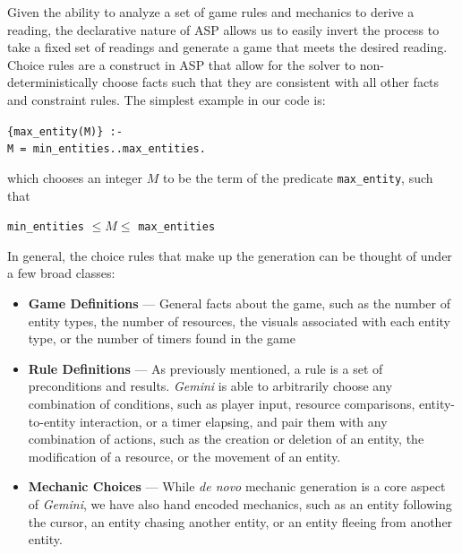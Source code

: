 \documentclass[12pt]{report}
\begin{document}
Given the ability to analyze a set of game rules and mechanics to derive a reading, the declarative nature of ASP allows us to easily invert the process to take a fixed set of readings and generate a game that meets the desired reading. 
Choice rules are a construct in ASP that allow for the solver to non-deterministically choose facts such that they are consistent with all other facts and constraint rules.  The simplest example in our code is:

\texttt{\{max\_entity(M)\} :- \\
\indent \indent M = min\_entities..max\_entities.}

\noindent which chooses an integer $M$ to be the term of the predicate \texttt{max\_entity}, such that 

\texttt{min\_entities} $ \leq M \leq $ \texttt{max\_entities}

In general, the choice rules that make up the generation can be thought of under a few broad classes:

\begin{itemize}
  \setlength\itemsep{-1mm}
\item \textbf{Game Definitions} --- General facts about the game, such as the number of entity types, the number of resources, the visuals associated with each entity type, or the number of timers found in the game

\item \textbf{Rule Definitions} --- As previously mentioned, a rule is a set of preconditions and results.  \textit{Gemini} is able to arbitrarily choose any combination of conditions, such as player input, resource comparisons, entity-to-entity interaction, or a timer elapsing, and pair them with any combination of actions, such as the creation or deletion of an entity, the modification of a resource, or the movement of an entity.

\item \textbf{Mechanic Choices} --- While \textit{de novo} mechanic generation is a core aspect of \textit{Gemini}, we have also hand encoded mechanics, such as an entity following the cursor, an entity chasing another entity, or an entity fleeing from another entity.  
\end{itemize}
\end{document}
